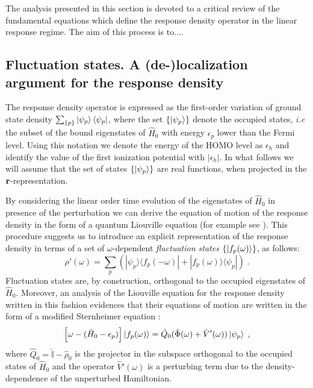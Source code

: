 \documentclass[reprint,aps,prb]{revtex4-1}
\renewcommand{\r}{{\bf r}}
\newcommand{\eps}{\epsilon}
\newcommand{\be}{\begin{equation}}
\newcommand{\ee}{\end{equation}}
\newcommand{\lb}{\label}
\newcommand{\op}[1]{\hat {#1}}
\newcommand{\ketbra}[2]{| #1 \rangle \langle #2 |}
\newcommand{\dmnot}{\op{\rho}_0}
\newcommand{\dm}{\op{\rho}}
\newcommand{\hnot}{\op{H}_0}
\newcommand{\identity}{\op{\mathbb I}}
\begin{document}
The analysis presented in this section is devoted to a critical review of the fundamental equations which define the response density operator in the linear response regime.    
The aim of this process is to....


\subsection{Fluctuation states. A (de-)localization argument for the response density}

The response density operator is expressed as the first-order variation of ground state density $\sum_{\{p\}} \ket{\psi_p} \bra{\psi_p}$, where the set $\{\ket{\psi_p}\}$ denote the 
occupied states, \emph{i.e} the subset of the bound eigenstates of $\hnot$ with energy $\eps_p$ lower than the Fermi level. Using this notation we denote the energy of the HOMO level 
as $\eps_h$ and identify the value of the first ionization potential with $|\eps_h|$. In what follows we will assume that the set of states $\{\ket{\psi_p}\}$ are real functions, when 
projected in the $\r$-representation.  

By considering the linear order time evolution of the eigenstates of $\hnot$ in presence of the perturbation we can derive the equation of motion of the response density in the form of 
a quantum Liouville equation (for example see \cite{baroni2008}). This procedure suggests us to introduce an explicit representation of the response density in terms of a set of 
$\omega$-dependent \emph{fluctuation states} $\{\ket{f_p(\omega)}\}$, as follows: 
\be\lb{rhoPrimeFluctuationStateDef1}
\dm'(\omega) = \sum_p\left(\ketbra{\psi_p}{f_p(-\omega)} + \ketbra{f_p(\omega)}{\psi_p}\right) \;.
\ee
Fluctuation states are, by construction, orthogonal to the occupied eigenstates of $\hnot$. Moreover, an analysis of the Liouville equation for the response density written in this 
fashion evidences that their equations of motion are written in the form of a modified Sternheimer equation \cite{mahan1980}:
\be\lb{fluctuationStateEqMotion1}
\left[\omega - (\hnot-\eps_p)\right]\ket{f_p(\omega)} = \op Q_0(\op\Phi(\omega)+\op V'(\omega))\ket{\psi_p} \;,
\ee
where $\op Q_0=\identity-\dmnot$ is the projector in the subspace orthogonal to the occupied states of $\hnot$ and the operator $\op V'(\omega)$ is a perturbing term due to the 
density-dependence of the unperturbed Hamiltonian.
\end{document}

